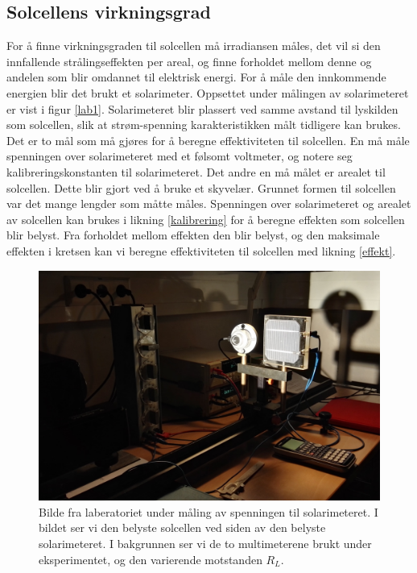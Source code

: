 \documentclass[%
 reprint,
 amsmath,amssymb,
 aps,
 norsk,
 booktabs
]{revtex4-1}
\begin{document}
\subsection{Solcellens virkningsgrad}
For å finne virkningsgraden til solcellen må irradiansen måles, det vil si den innfallende strålingseffekten per areal, og finne forholdet mellom denne og andelen som blir omdannet til elektrisk energi. For å måle den innkommende energien blir det brukt et solarimeter. Oppsettet under målingen av solarimeteret er vist i figur \vref{lab1}. Solarimeteret blir plassert ved samme avstand til lyskilden som solcellen, slik at strøm-spenning karakteristikken målt tidligere kan brukes. Det er to mål som må gjøres for å beregne effektiviteten til solcellen. En må måle spenningen over solarimeteret med et følsomt voltmeter, og notere seg kalibreringskonstanten til solarimeteret. Det andre en må målet er arealet til solcellen. Dette blir gjort ved å bruke et skyvelær. Grunnet formen til solcellen var det mange lengder som måtte måles. Spenningen over solarimeteret og arealet av solcellen kan brukes i likning \eqref{kalibrering} for å beregne effekten som solcellen blir belyst. Fra forholdet mellom effekten den blir belyst, og den maksimale effekten i kretsen kan vi beregne effektiviteten til solcellen med likning \eqref{effekt}.
\begin{figure}[h!]
  \centering
  \includegraphics[scale=0.065]{lab1.jpg}
  \caption{Bilde fra laberatoriet under måling av spenningen til solarimeteret. I bildet ser vi den belyste solcellen ved siden av den belyste solarimeteret. I bakgrunnen ser vi de to multimeterene brukt under eksperimentet, og den varierende motstanden $R_L$.}
  \label{lab1}
\end{figure}
\end{document}
